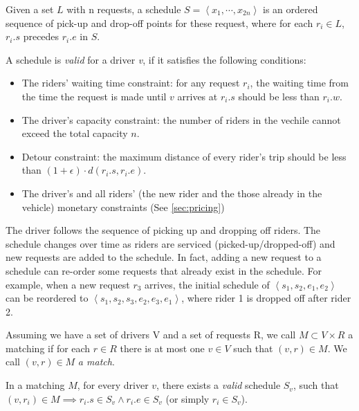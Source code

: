 \begin{definition} [Schedule]
Given a set $L$ with n requests, a schedule $S= \left\langle x_1, \cdots, x_{2n} \right\rangle$ is an ordered sequence of pick-up and drop-off points for these request, where for each $r_i \in L$, $r_i.s$ precedes $r_i.e$ in $S$. 
\end{definition}

A schedule is \textit{valid} for a driver \textit{v}, if it satisfies the following conditions:

\begin{itemize}
\item The riders' waiting time constraint: for any request $r_i$, the waiting time from the time the request is made until $v$ arrives at $r_i.s$ should be less than $r_i.w$.
\item The driver's capacity constraint: the number of riders in the vechile cannot exceed the total capacity $n$.
\item Detour constraint: the maximum distance of every rider's trip should be less than $(1+\epsilon) \cdot d(r_i.s, r_i.e)$.
\item The driver's and all riders' (the new rider and the those already in the vehicle) monetary constraints (See \cref{sec:pricing})
\end{itemize}

The driver follows the sequence of picking up and dropping off riders. The schedule changes over time as riders are serviced (picked-up/dropped-off) and new requests are added to the schedule. In fact, adding a new request to a schedule can re-order some requests that already exist in the schedule. For example, when a new request $r_3$ arrives, the initial schedule of $\left\langle s_1, s_2, e_1, e_2 \right\rangle$ can be reordered to $\left\langle s_1, s_2, s_3, e_2, e_3, e_1 \right\rangle$, where rider 1 is dropped off after rider 2.

\begin{definition} [Matching]
Assuming we have a set of drivers V and a set of requests R, we call $M \subset V \times R$ a matching if for each $r \in R$ there is at most one $v \in V$ such that $\left( v, r \right) \in M$. We call $\left( v, r \right) \in M$ \emph{a match}.
\end{definition}

\noindent In a matching $M$, for every driver $v$, there exists a \textit{valid} schedule $S_v$, such that $(v, r_i) \in M \implies r_i.s \in S_v \wedge r_i.e \in S_v$ (or simply $r_i \in S_v$). 

